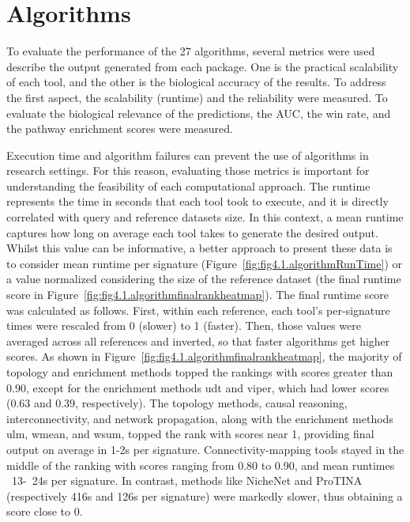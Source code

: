 \section{Algorithms} %
\label{sec:algorithmsresults}

To evaluate the performance of the 27 algorithms, several metrics were used describe  the output generated from each package. One is the practical scalability of each tool, and the other is the biological accuracy of the results. To address the first aspect, the scalability (runtime) and the reliability were measured. To evaluate the biological relevance of the predictions, the \gls{AUC}, the win rate, and the pathway enrichment scores were measured.

Execution time and algorithm failures can prevent the use of algorithms in research settings. For this reason, evaluating those metrics is important for understanding the feasibility of each computational approach. The runtime represents the time in seconds that each tool took to execute, and it is directly correlated with query and reference datasets size. In this context, a mean runtime captures how long on average each tool takes to generate the desired output. Whilst this value can be informative, a better approach to present these data is to consider mean runtime per signature (Figure~\ref{fig:fig4.1.algorithmRunTime}) or a value normalized considering the size of the reference dataset (the final runtime score in Figure~\ref{fig:fig4.1.algorithmfinalrankheatmap}). The final runtime score was calculated as follows. First, within each reference, each tool's per-signature times were rescaled from 0 (slower) to 1 (faster). Then, those values were averaged across all references and inverted, so that faster algorithms get higher scores. As shown in Figure~\ref{fig:fig4.1.algorithmfinalrankheatmap}, the majority of topology and enrichment methods topped the rankings with scores greater than 0.90, except for the enrichment methods udt and viper, which had lower scores (0.63 and 0.39, respectively). The topology methods, causal reasoning, interconnectivity, and network propagation, along with the enrichment methods ulm, wmean, and wsum, topped the rank with scores near 1, providing final output on average in 1-2s per signature. Connectivity-mapping tools stayed in the middle of the ranking with scores ranging from 0.80 to 0.90, and mean runtimes ~13-~24s per signature. In contrast, methods like NicheNet and ProTINA (respectively 416s and 126s per signature) were markedly slower, thus obtaining a score close to 0.

